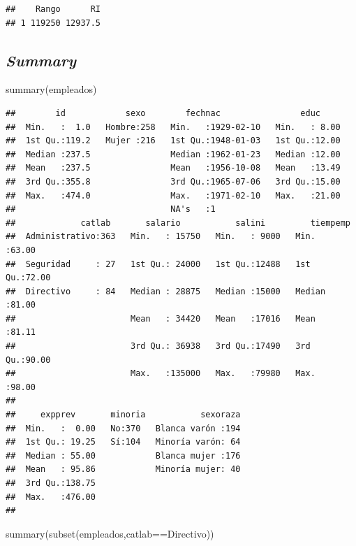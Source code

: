 \documentclass[
]{book}
\newenvironment{Shaded}{\begin{snugshade}}{\end{snugshade}}
\newcommand{\FunctionTok}[1]{\textcolor[rgb]{0.00,0.00,0.00}{#1}}
\newcommand{\NormalTok}[1]{#1}
\newcommand{\SpecialCharTok}[1]{\textcolor[rgb]{0.00,0.00,0.00}{#1}}
\newcommand{\StringTok}[1]{\textcolor[rgb]{0.31,0.60,0.02}{#1}}
\theoremstyle{break}
\theoremstyle{nonumberplain}
\begin{document}
\begin{verbatim}
##    Rango      RI
## 1 119250 12937.5
\end{verbatim}

\hypertarget{summary}{%
\subsection{\texorpdfstring{\emph{Summary}}{Summary}}\label{summary}}

\begin{Shaded}
\begin{Highlighting}[]
\FunctionTok{summary}\NormalTok{(empleados)}
\end{Highlighting}
\end{Shaded}

\begin{verbatim}
##        id            sexo        fechnac                educ      
##  Min.   :  1.0   Hombre:258   Min.   :1929-02-10   Min.   : 8.00  
##  1st Qu.:119.2   Mujer :216   1st Qu.:1948-01-03   1st Qu.:12.00  
##  Median :237.5                Median :1962-01-23   Median :12.00  
##  Mean   :237.5                Mean   :1956-10-08   Mean   :13.49  
##  3rd Qu.:355.8                3rd Qu.:1965-07-06   3rd Qu.:15.00  
##  Max.   :474.0                Max.   :1971-02-10   Max.   :21.00  
##                               NA's   :1                           
##             catlab       salario           salini         tiempemp    
##  Administrativo:363   Min.   : 15750   Min.   : 9000   Min.   :63.00  
##  Seguridad     : 27   1st Qu.: 24000   1st Qu.:12488   1st Qu.:72.00  
##  Directivo     : 84   Median : 28875   Median :15000   Median :81.00  
##                       Mean   : 34420   Mean   :17016   Mean   :81.11  
##                       3rd Qu.: 36938   3rd Qu.:17490   3rd Qu.:90.00  
##                       Max.   :135000   Max.   :79980   Max.   :98.00  
##                                                                       
##     expprev       minoria           sexoraza  
##  Min.   :  0.00   No:370   Blanca varón :194  
##  1st Qu.: 19.25   Sí:104   Minoría varón: 64  
##  Median : 55.00            Blanca mujer :176  
##  Mean   : 95.86            Minoría mujer: 40  
##  3rd Qu.:138.75                               
##  Max.   :476.00                               
## 
\end{verbatim}

\begin{Shaded}
\begin{Highlighting}[]
\FunctionTok{summary}\NormalTok{(}\FunctionTok{subset}\NormalTok{(empleados,catlab}\SpecialCharTok{==}\StringTok{\textquotesingle{}Directivo\textquotesingle{}}\NormalTok{))}
\end{Highlighting}
\end{Shaded}
\end{document}
